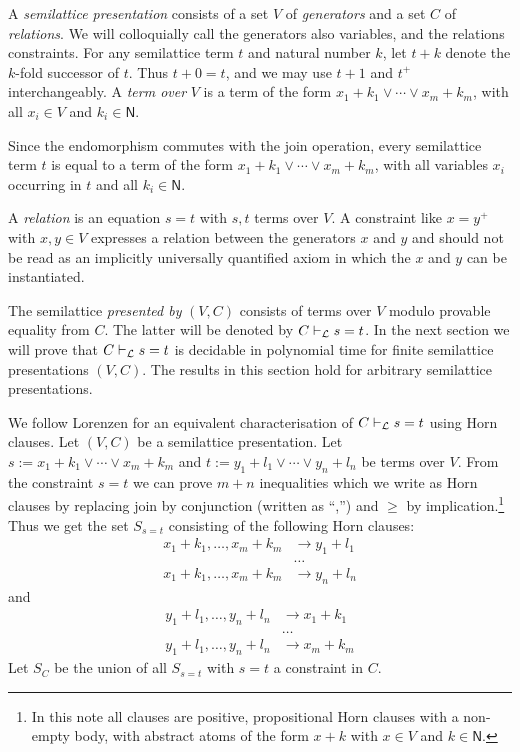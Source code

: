 \documentclass[11pt,a4paper]{article}
\newcommand{\N}{\mathsf{N}}
\newcommand\jterm[3]{{{#1_1}+{#2_1}}\vee\cdots\vee{{#1_#3}+{#2_#3}}}
\newcommand\jbody[3]{{{#1_1}+{#2_1}},\ldots,{{#1_#3}+{#2_#3}}}
\newcommand\lathy{{\cal L}}
\newcommand\prvL{\vdash_{\lathy}}
\begin{document}
A \emph{semilattice presentation} consists of a
set $V$ of \emph{generators} and a set $C$ of \emph{relations}.
We will colloquially call the generators also variables, and the
relations constraints.
For any semilattice term $t$ and natural number $k$, 
let $t+k$ denote the $k$-fold successor of $t$.
Thus $t+0 = t$, and we may use $t+1$ and $t^+$ interchangeably. 
A \emph{term over} $V$ is
a term of the form $\jterm{x}{k}{m}$, 
with all $x_i\in V$ and $k_i\in \N$.
 
Since the endomorphism commutes with the join operation,
every semilattice term $t$ is equal to a term of the
form $\jterm{x}{k}{m}$, with all variables $x_i$ occurring in $t$
and all $k_i\in \N$.

A \emph{relation} is an equation $s=t$ with $s,t$ terms over $V$.
A constraint like $x=y^+$ with $x,y\in V$
expresses a relation between the generators $x$ and $y$ and 
should not be read as an implicitly universally quantified axiom
in which the $x$ and $y$ can be instantiated.

The semilattice \emph{presented by} $(V,C)$ consists of terms over $V$
modulo provable equality from $C$. The latter will be denoted
by $C\prvL s=t$. In the next section we will prove that
$C\prvL s=t$ is decidable in polynomial time for finite semilattice presentations $(V,C)$.
The results in this section hold for arbitrary semilattice presentations.

We follow Lorenzen \cite[Section 2]{Lorenzen51} for an equivalent 
characterisation of $C\prvL s=t$ using Horn clauses.
Let $(V,C)$ be a semilattice presentation.
Let $s:= \jterm{x}{k}{m}$ and $t:= \jterm{y}{l}{n}$ be
terms over $V$. From the constraint $s=t$
we can prove $m+n$ inequalities which we write as
Horn clauses by replacing join by conjunction (written as ``,'') and $\geq$
by implication.\footnote{In this note all clauses are positive,
propositional Horn clauses with a non-empty body,
with abstract atoms of the form $x+k$ with $x\in V$ and $k\in \N$.} 
Thus we get the set $S_{s=t}$ consisting of the following Horn clauses:
\begin{align*}
\jbody{x}{k}{m} &\to y_1+l_1 \\
&\ldots  \\
\jbody{x}{k}{m} &\to y_n+l_n 
\end{align*}
and
\begin{align*}
\jbody{y}{l}{n} &\to x_1+k_1 \\
&\ldots \\
\jbody{y}{l}{n} &\to x_m+k_m 
\end{align*}
Let $S_C$ be the union of all $S_{s=t}$ with $s=t$ 
a constraint in $C$.
\end{document}
